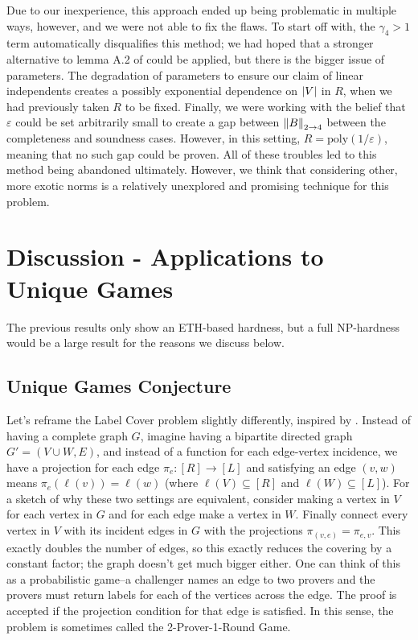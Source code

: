\documentclass[10pt]{article}
\begin{document}
Due to our inexperience, this approach ended up being problematic in multiple ways, however, and we were not able to fix the flaws. To start off with, the $\gamma_4 > 1$ term automatically disqualifies this method; we had hoped that a stronger alternative to lemma A.2 of \cite{pqalmost} could be applied, but there is the bigger issue of parameters. The degradation of parameters to ensure our claim of linear independents creates a possibly exponential dependence on $\abs{V}$ in $R$, when we had previously taken $R$ to be fixed. Finally, we were working with the belief that $\varepsilon$ could be set arbitrarily small to create a gap between $\norm{B}_{2 \to 4}$ between the completeness and soundness cases. However, in this setting, $R = \textrm{poly}(1/\varepsilon)$, meaning that no such gap could be proven. All of these troubles led to this method being abandoned ultimately. However, we think that considering other, more exotic norms is a relatively unexplored and promising technique for this problem.

\section{Discussion - Applications to Unique Games}
The previous results only show an ETH-based hardness, but a full NP-hardness would be a large result for the reasons we discuss below.

\subsection{Unique Games Conjecture}
Let's reframe the Label Cover problem slightly differently, inspired by \cite{ugc-survey}. Instead of having a complete graph $G$, imagine having a bipartite directed graph $G' = (V \cup W, E)$, and instead of a function for each edge-vertex incidence, we have a projection for each edge $\pi_e: [R] \to [L]$ and satisfying an edge $(v, w)$ means $\pi_e(\ell(v)) = \ell(w)$ (where $\ell(V) \subseteq [R]$ and $\ell(W) \subseteq [L]$). For a sketch of why these two settings are equivalent, consider making a vertex in $V$ for each vertex in $G$ and for each edge make a vertex in $W$. Finally connect every vertex in $V$ with its incident edges in $G$ with the projections $\pi_{(v, e)} = \pi_{e, v}$. This exactly doubles the number of edges, so this exactly reduces the covering by a constant factor; the graph doesn't get much bigger either. One can think of this as a probabilistic game--a challenger names an edge to two provers and the provers must return labels for each of the vertices across the edge. The proof is accepted if the projection condition for that edge is satisfied. In this sense, the problem is sometimes called the 2-Prover-1-Round Game.
\end{document}

